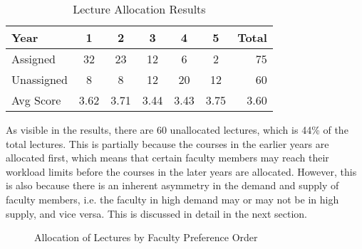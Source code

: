 \begin{table}[H]
  \centering
  \begin{tabular}{|l|c|c|c|c|c|r|}
    \hline
    \textbf{Year} & \textbf{1} & \textbf{2} & \textbf{3} & \textbf{4} & \textbf{5} & \textbf{Total} \\ \hline
    Assigned      & 32         & 23         & 12         & 6          & 2          & 75             \\ \hline
    Unassigned    & 8          & 8          & 12         & 20         & 12         & 60             \\ \hline
    Avg Score     & 3.62       & 3.71       & 3.44       & 3.43       & 3.75       & 3.60           \\ \hline
  \end{tabular}
  \caption{Lecture Allocation Results}
  \label{tab:lec_alloc_results}
\end{table}

As visible in the results, there are 60 unallocated lectures, which is 44\% of the total lectures. This is partially because the courses in the earlier years are allocated first, which means that certain faculty members may reach their workload limits before the courses in the later years are allocated. However, this is also because there is an inherent asymmetry in the demand and supply of faculty members, i.e. the faculty in high demand may or may not be in high supply, and vice versa. This is discussed in detail in the next section.

\begin{figure}[H]
  \centering
  \caption{Allocation of Lectures by Faculty Preference Order}
  \label{fig:pref_order}
\end{figure}

